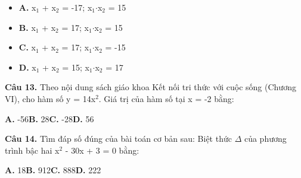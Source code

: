 \documentclass[11pt,a4paper]{article}
\begin{document}
\begin{itemize}\setlength{\itemsep}{1pt}\setlength{\parskip}{0pt}
  \item[] \textbf{A.} x$_1$ + x$_2$ = -17; x$_1$$\cdot$x$_2$ = 15
  \item[] \textbf{B.} x$_1$ + x$_2$ = 17; x$_1$$\cdot$x$_2$ = 15
  \item[] \textbf{C.} x$_1$ + x$_2$ = 17; x$_1$$\cdot$x$_2$ = -15
  \item[] \textbf{D.} x$_1$ + x$_2$ = 15; x$_1$$\cdot$x$_2$ = 17
\end{itemize}\vspace{2pt}
\textbf{\color{primary} Câu 13.} Theo nội dung sách giáo khoa Kết nối tri thức với cuộc sống (Chương VI), cho hàm số y = 14x$^2$. Giá trị của hàm số tại x = -2 bằng:\par
\hspace*{1.5em}\textbf{A.} -56\quad\quad \textbf{B.} 28\quad\quad \textbf{C.} -28\quad\quad \textbf{D.} 56\par\vspace{2pt}
\textbf{\color{primary} Câu 14.} Tìm đáp số đúng của bài toán cơ bản sau: Biệt thức $\Delta$ của phương trình bậc hai x$^2$ - 30x + 3 = 0 bằng:\par
\hspace*{1.5em}\textbf{A.} 18\quad\quad \textbf{B.} 912\quad\quad \textbf{C.} 888\quad\quad \textbf{D.} 222\par\vspace{2pt}
\end{document}
